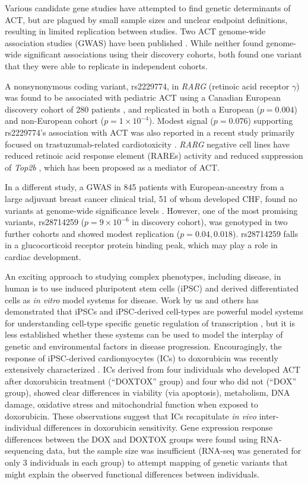 \documentclass[9pt,lineno]{elife}
\begin{document}
Various candidate gene studies have attempted to find genetic determinants of ACT, but are plagued by small sample sizes and unclear endpoint definitions, resulting in limited replication between studies. 
Two ACT genome-wide association studies (GWAS) have been published \citep{Aminkeng2015,Schneider2016}. 
While neither found genome-wide significant associations using their discovery cohorts, both found one variant that they were able to replicate in independent cohorts. 

A nonsynonymous coding variant, rs2229774, in \emph{RARG} (retinoic acid receptor $\gamma$) was found to be associated with pediatric ACT using a Canadian European discovery cohort of 280 patients \citep{Aminkeng2015}, and replicated in both a European ($p=0.004$) and non-European cohort ($p=1 \times 10^{-4}$). 
Modest signal ($p=0.076$) supporting rs2229774's association with ACT was also reported in a recent study primarily focused on trastuzumab-related cardiotoxicity \citep{Serie2017}.
\emph{RARG} negative cell lines have reduced retinoic acid response element (RAREs) activity and reduced suppression of \emph{Top2b} \citep{Aminkeng2015}, which has been proposed as a mediator of ACT. 
 
In a different study, a GWAS in 845 patients with European-ancestry from a large adjuvant breast cancer clinical trial, 51 of whom developed CHF, found no variants at genome-wide significance levels \citep{Schneider2016}. However, one of the most promising variants, rs28714259 ($p=9 \times 10^{-6}$ in discovery cohort), was genotyped in two further cohorts and showed modest replication ($p=0.04, 0.018$). rs28714259 falls in a glucocorticoid receptor protein binding peak, which may play a role in cardiac development. 

An exciting approach to studying complex phenotypes, including disease, in human is to use induced pluripotent stem cells (iPSC) and derived differentiated cells as \emph{in vitro} model systems for disease. Work by us and others has demonstrated that iPSCs and iPSC-derived cell-types are powerful model systems for understanding cell-type specific genetic regulation of transcription \citep{Thomas2015,Burrows2016,Banovich091660,Kilpinen2017,Alasoo102392}, but it is less established whether these systems can be used to model the interplay of genetic and environmental factors in disease progression. Encouragingly, the response of iPSC-derived cardiomyocytes (ICs) to doxorubicin was recently extensively characterized \citep{Burridge2016}. ICs derived from four individuals who developed ACT after doxorubicin treatment (``DOXTOX'' group) and four who did not (``DOX'' group), showed clear differences in viability (via apoptosis), metabolism, DNA damage, oxidative stress and mitochondrial function when exposed to doxorubicin. These observations suggest that ICs recapitulate \emph{in vivo} inter-individual differences in doxorubicin sensitivity. Gene expression response differences between the DOX and DOXTOX groups were found using RNA-sequencing data, but the sample size was insufficient (RNA-seq was generated for only 3 individuals in each group) to attempt mapping of genetic variants that might explain the observed functional differences between individuals. 
\end{document}
